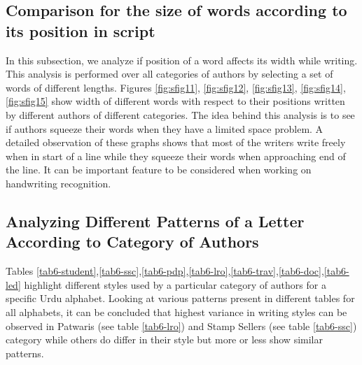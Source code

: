       
      
      


 




\subsection{Comparison for the size of words according to its position in script}

In this subsection, we analyze if position of a word affects its width while writing. This analysis is performed over all categories of authors by selecting a set of words of different lengths. Figures \ref{fig:sfig11}, \ref{fig:sfig12}, \ref{fig:sfig13}, \ref{fig:sfig14}, \ref{fig:sfig15} show width of different words with respect to their positions written by different authors of different categories. The idea behind this analysis is to see if authors squeeze their words when they have a limited space problem. A detailed observation of these graphs shows that most of the writers write freely when in start of a line while they squeeze their words when approaching end of the line. It can be important feature to be considered when working on handwriting recognition. 







\subsection{Analyzing Different Patterns of a Letter According to Category of Authors}

Tables \ref{tab6-student},\ref{tab6-ssc},\ref{tab6-pdp},\ref{tab6-lro},\ref{tab6-trav},\ref{tab6-doc},\ref{tab6-led} highlight different styles used by a particular category of authors for a specific Urdu alphabet. Looking at various patterns present in different tables for all alphabets, it can be concluded that highest variance in writing styles can be observed in Patwaris (see table \ref{tab6-lro}) and Stamp Sellers (see table \ref{tab6-ssc}) category while others do differ in their style but more or less show similar patterns. 

